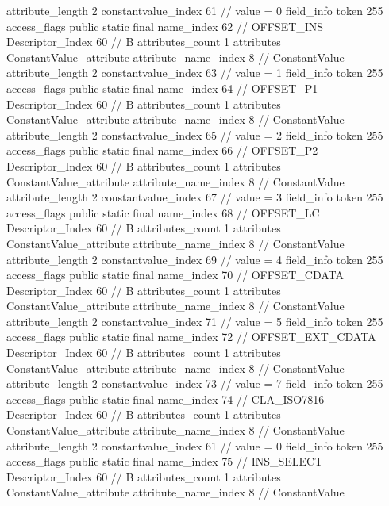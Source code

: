 {{{{{{{					attribute_length	2
					constantvalue_index	61		// value = 0
				}
				}
			}
			field_info {
				token	255
				access_flags	public static final
				name_index	62		// OFFSET_INS
				Descriptor_Index	60		// B
				attributes_count	1
				attributes {
				ConstantValue_attribute {
					attribute_name_index	8		// ConstantValue
					attribute_length	2
					constantvalue_index	63		// value = 1
				}
				}
			}
			field_info {
				token	255
				access_flags	public static final
				name_index	64		// OFFSET_P1
				Descriptor_Index	60		// B
				attributes_count	1
				attributes {
				ConstantValue_attribute {
					attribute_name_index	8		// ConstantValue
					attribute_length	2
					constantvalue_index	65		// value = 2
				}
				}
			}
			field_info {
				token	255
				access_flags	public static final
				name_index	66		// OFFSET_P2
				Descriptor_Index	60		// B
				attributes_count	1
				attributes {
				ConstantValue_attribute {
					attribute_name_index	8		// ConstantValue
					attribute_length	2
					constantvalue_index	67		// value = 3
				}
				}
			}
			field_info {
				token	255
				access_flags	public static final
				name_index	68		// OFFSET_LC
				Descriptor_Index	60		// B
				attributes_count	1
				attributes {
				ConstantValue_attribute {
					attribute_name_index	8		// ConstantValue
					attribute_length	2
					constantvalue_index	69		// value = 4
				}
				}
			}
			field_info {
				token	255
				access_flags	public static final
				name_index	70		// OFFSET_CDATA
				Descriptor_Index	60		// B
				attributes_count	1
				attributes {
				ConstantValue_attribute {
					attribute_name_index	8		// ConstantValue
					attribute_length	2
					constantvalue_index	71		// value = 5
				}
				}
			}
			field_info {
				token	255
				access_flags	public static final
				name_index	72		// OFFSET_EXT_CDATA
				Descriptor_Index	60		// B
				attributes_count	1
				attributes {
				ConstantValue_attribute {
					attribute_name_index	8		// ConstantValue
					attribute_length	2
					constantvalue_index	73		// value = 7
				}
				}
			}
			field_info {
				token	255
				access_flags	public static final
				name_index	74		// CLA_ISO7816
				Descriptor_Index	60		// B
				attributes_count	1
				attributes {
				ConstantValue_attribute {
					attribute_name_index	8		// ConstantValue
					attribute_length	2
					constantvalue_index	61		// value = 0
				}
				}
			}
			field_info {
				token	255
				access_flags	public static final
				name_index	75		// INS_SELECT
				Descriptor_Index	60		// B
				attributes_count	1
				attributes {
				ConstantValue_attribute {
					attribute_name_index	8		// ConstantValue
}}}}}}}
